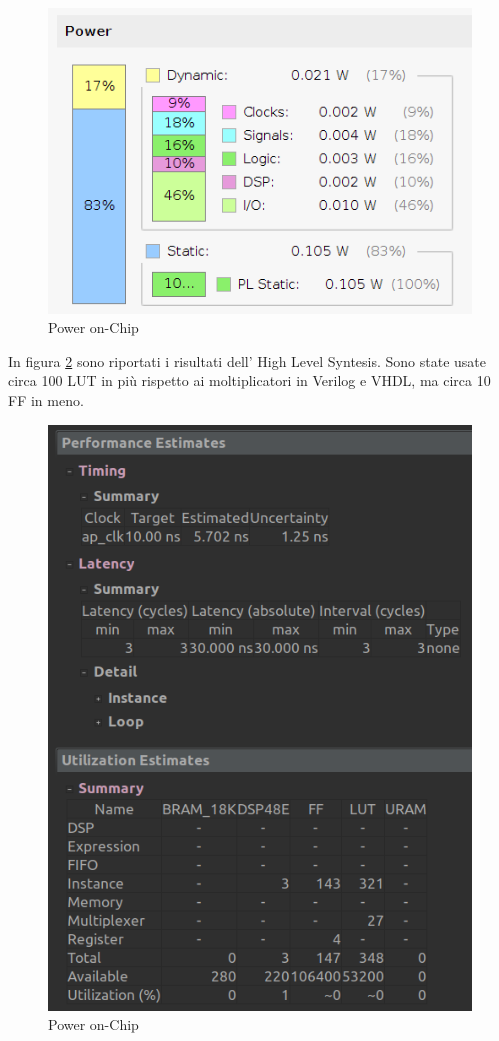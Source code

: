 \documentclass[]{IEEEtran}
\begin{document}
\begin{figure}[!htb]
    \centering
    \includegraphics[width=0.9\linewidth]{figures/power_onChip}
    \caption{Power on-Chip}
    \label{fig:POWER_ONCHIP}
\end{figure}

In figura \ref{fig:HLS} sono riportati i risultati dell' High Level Syntesis. Sono state usate circa 100 LUT in più rispetto ai moltiplicatori in Verilog e VHDL, ma circa 10 FF in meno. 
\begin{figure}[!htb]
    \centering
    \includegraphics[width=0.9\linewidth]{figures/hls}
    \caption{Power on-Chip}
    \label{fig:HLS}
\end{figure}
\end{document}
